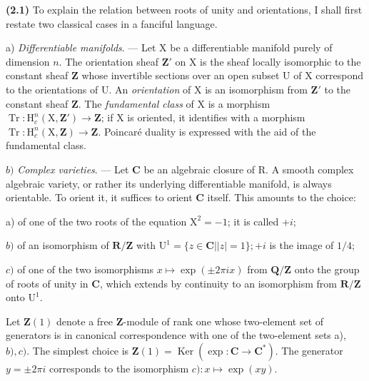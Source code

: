 \documentclass[10pt,leqno]{article}
\begin{document}
\noindent \textbf{(2.1)} To explain the relation between roots of unity and orientations, \(\mathrm{I}\) shall first restate two classical cases in a fanciful language.\par

\noindent a) \emph{Differentiable manifolds}. — Let \(\mathrm{X}\) be a differentiable manifold purely of dimension \(n\). The orientation sheaf \(\mathbf{Z}'\) on \(\mathrm{X}\) is the sheaf locally isomorphic to the constant sheaf \(\mathbf{Z}\) whose invertible sections over an open subset \(\mathrm{U}\) of \(\mathrm{X}\) correspond to the orientations of \(\mathrm{U}\). An \emph{orientation} of \(\mathrm{X}\) is an isomorphism from \(\mathbf{Z}'\) to the constant sheaf \(\mathbf{Z}\). The \emph{fundamental class} of \(\mathrm{X}\) is a morphism \(\operatorname{Tr}:\mathrm{H}_{c}^{n}(\mathrm{X},\mathbf{Z}')\longrightarrow \mathbf{Z}\); if \(\mathrm{X}\) is oriented, it identifies with a morphism \(\operatorname{Tr}:\mathrm{H}_{c}^{n}(\mathrm{X},\mathbf{Z})\longrightarrow \mathbf{Z}\). Poincaré duality is expressed with the aid of the fundamental class.\par

\noindent \(b)\) \emph{Complex varieties}. — Let \(\mathbf{C}\) be an algebraic closure of R. A smooth complex algebraic variety, or rather its underlying differentiable manifold, is always orientable. To orient it, it suffices to orient \(\mathbf{C}\) itself. This amounts to the choice:\par

\noindent a) of one of the two roots of the equation \(\mathrm{X}^{2}=- 1\); it is called +\(i\);\par

\noindent \(b)\) of an isomorphism of \(\mathbf{R}/\mathbf{Z}\) with \(\mathrm{U}^{1}=\{z\in \mathbf{C} | |z|=1\}; +i\) is the image of \(1/4\);\par

\noindent \(c)\) of one of the two isomorphisms \(x\longmapsto \operatorname{exp}(\pm 2\pi ix)\) from \(\mathbf{Q}/\mathbf{Z}\) onto the group of roots of unity in \(\mathbf{C}\), which extends by continuity to an isomorphism from \(\mathbf{R}/\mathbf{Z}\) onto \(\mathrm{U}^{1}\).\par

\noindent Let \(\mathbf{Z}(1)\) denote a free \(\mathbf{Z}\)-module of rank one whose two-element set of generators is in canonical correspondence with one of the two-element sets a), \(b), c)\). The simplest choice is \(\mathbf{Z}(1)=\operatorname{Ker}(\operatorname{exp}:\mathbf{C}\longrightarrow \mathbf{C}^{*})\). The generator \(y=\pm 2\pi i\) corresponds to the isomorphism \(c):x\longmapsto \operatorname{exp}(xy)\).\par
\end{document}
